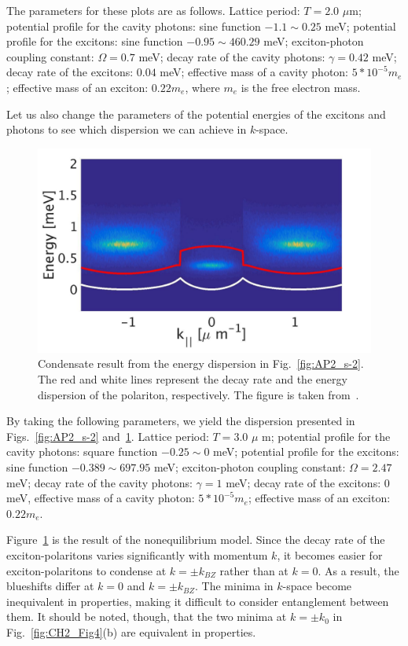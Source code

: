 %
%
%
The parameters for these plots are as follows. Lattice period: $T=2.0$ $\mu$m; potential profile for the cavity photons: sine function $-1.1\sim0.25$ meV; potential profile for the excitons: sine function $-0.95 \sim 460.29$ meV; exciton-photon coupling constant: $\Omega=0.7$ meV; decay rate of the cavity photons: $\gamma =0.42$ meV; decay rate of the excitons: $0.04 $ meV; effective mass of a cavity photon: $5*10^{-5} m_e$; effective mass of an exciton: $0.22 m_e$, where $m_e$ is the free electron mass.

Let us also change the parameters of the potential energies of the excitons and photons to see which dispersion we can achieve in $k$-space.
%
%
%
\begin{figure}[ht]
	\centering
	\includegraphics[width=0.555555\linewidth]{Fig/Ap2/SP-5.pdf}
	\caption[Condensation in the alternative configuration]{Condensate result from the energy dispersion in Fig.~\ref{fig:AP2_s-2}. The red and white lines represent the decay rate and the energy dispersion of the polariton, respectively. The figure is taken from~\cite{Sun:2017ab}.}
	\label{fig:AP2_s-3}
\end{figure}
%
%
%
By taking the following parameters, we yield the dispersion presented in Figs.~\ref{fig:AP2_s-2} and~\ref{fig:AP2_s-3}. Lattice period: $T=3.0$ $\mu$ m; potential profile for the cavity photons: square function $-0.25\sim0$ meV; potential profile for the excitons: sine function $-0.389 \sim 697.95$ meV; exciton-photon coupling constant: $\Omega=2.47$ meV; decay rate of the cavity photons: $\gamma =1$ meV; decay rate of the excitons: $0$ meV, effective mass of a cavity photon: $5*10^{-5} m_e$; effective mass of an exciton: $0.22 m_e$.

Figure~\ref{fig:AP2_s-3} is the result of the nonequilibrium model. Since the decay rate of the exciton-polaritons varies significantly with momentum $k$, it becomes easier for exciton-polaritons to condense at $k=\pm k_{BZ}$ rather than at $k=0$. As a result, the blueshifts differ at $k=0$ and $k=\pm k_{BZ}$. The minima in $k$-space become inequivalent in properties, making it difficult to consider entanglement between them. It should be noted, though, that the two minima at $k=\pm k_0$ in Fig.~\ref{fig:CH2_Fig4}(b) are equivalent in properties.


